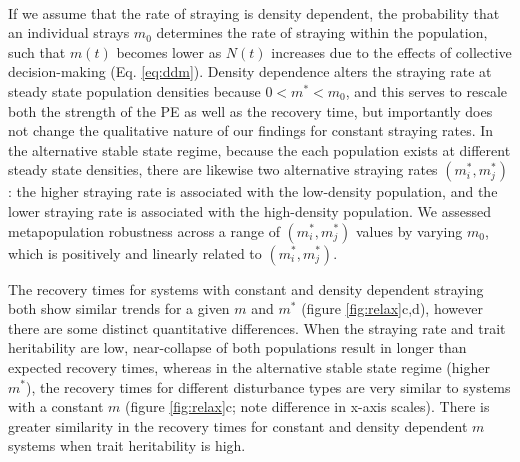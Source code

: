 \documentclass[twocolumn,preprintnumbers,amsmath,amssymb,superscriptaddress]{revtex4}
\begin{document}

\\
\noindent If we assume that the rate of straying is density dependent, the probability that an individual strays $m_0$ determines the rate of straying within the population, such that $m(t)$ becomes lower as $N(t)$ increases due to the effects of collective decision-making \cite{Berdahl:2016dx} (Eq. \ref{eq:ddm}).
Density dependence alters the straying rate at steady state population densities because $0 < m^* < m_0$, and this serves to rescale both the strength of the PE as well as the recovery time, but importantly does not change the qualitative nature of our findings for constant straying rates.
In the alternative stable state regime, because the each population exists at different steady state densities, there are likewise two alternative straying rates $(m_i^*,m_j^*)$: the higher straying rate is associated with the low-density population, and the lower straying rate is associated with the high-density population.
We assessed metapopulation robustness across a range of $(m_i^*,m_j^*)$ values by varying $m_0$, which is positively and linearly related to $(m_i^*,m_j^*)$.

The recovery times for systems with constant and density dependent straying both show similar trends for a given $m$ and $m^*$ (figure \ref{fig:relax}c,d), however there are some distinct quantitative differences.
When the straying rate and trait heritability are low, near-collapse of both populations result in longer than expected recovery times, whereas in the alternative stable state regime (higher $m^*$), the recovery times for different disturbance types are very similar to systems with a constant $m$ (figure \ref{fig:relax}c; note difference in x-axis scales).
There is greater similarity in the recovery times for constant and density dependent $m$ systems when trait heritability is high.
\end{document}
